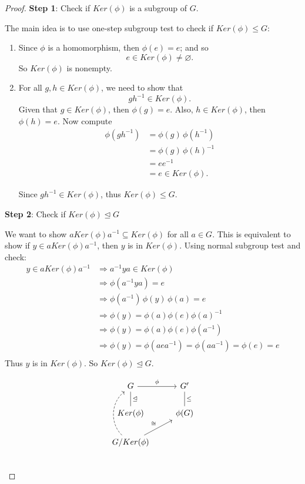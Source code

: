 \begin{proof}
    \textbf{Step 1}: Check if $Ker(\phi)$ is a subgroup of $G$.

    The main idea is to use one-step subgroup test to check if $Ker(\phi) \leq G$:
    \begin{enumerate}
        \item Since $\phi$ is a homomorphism, then $\phi(e) = e$; and so 
        \[
            e \in Ker(\phi) \neq \varnothing.
        \]
        So $Ker(\phi)$ is nonempty.

        \item For all $g,h \in Ker(\phi)$, we need to show that 
        \[
            gh^{-1} \in Ker(\phi).
        \]
        Given that $g \in Ker(\phi)$, then $\phi(g) = e$. Also, $h \in Ker(\phi)$, then $\phi(h) = e$. Now compute 
        \begin{align*}
            \phi(gh^{-1}) &= \phi(g)\, \phi(h^{-1})\\
            &= \phi(g)\, \phi(h)^{-1}\\
            &= ee^{-1}\\
            &= e \in Ker(\phi).
        \end{align*}

        Since $gh^{-1} \in Ker(\phi)$, thus $Ker(\phi) \leq G$.
    \end{enumerate}

    \textbf{Step 2}: Check if $Ker(\phi) \unlhd G$

    We want to show $aKer(\phi)a^{-1} \subseteq Ker(\phi)$ for all $a \in G$. This is equivalent to show if $y \in aKer(\phi)a^{-1}$, then $y$
    is in $Ker(\phi)$. Using normal subgroup test and check:
    \begin{align*}
        y \in aKer(\phi)a^{-1} &\Rightarrow a^{-1}ya \in Ker(\phi)\\
        &\Rightarrow \phi(a^{-1}ya) = e\\
        &\Rightarrow \phi(a^{-1})\, \phi(y)\, \phi(a) = e\\
        &\Rightarrow \phi(y) = \phi(a) \phi(e) \phi(a)^{-1}\\
        &\Rightarrow \phi(y) = \phi(a) \phi(e) \phi(a^{-1})\\
        &\Rightarrow \phi(y) = \phi(aea^{-1}) = \phi(aa^{-1}) = \phi(e) = e\\
    \end{align*}
    Thus $y$ is in $Ker(\phi)$. So $Ker(\phi) \unlhd G$.

    \[
        \begin{tikzcd}
            G \arrow["\phi"]{r} \arrow[dash, "\unlhd"]{d} & G' \arrow[dash, "\leq"]{d} \\
            Ker(\phi) & \phi(G)\\
            G/Ker(\phi) \arrow[dashed, bend left=50]{uu} \arrow["\cong"]{ur} & \\
        \end{tikzcd}
    \]


\end{proof}
